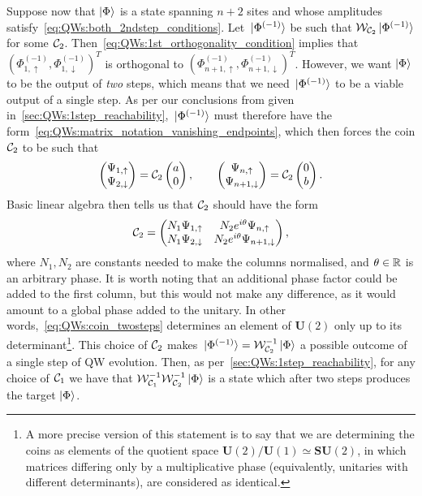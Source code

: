 Suppose now that $\ket\Phi$ is a state spanning $n+2$ sites and whose amplitudes satisfy~\cref{eq:QWs:both_2ndstep_conditions}.
Let $\ket*{\Phi^{(-1)}}$ be such that ${\mathcal{W}}_{{\mathcal{C}}_2}\ket*{\Phi^{(-1)}}$ for some ${\mathcal{C}}_2$.
Then~\cref{eq:QWs:1st_orthogonality_condition} implies that
$(\Phi^{(-1)}_{1,\uparrow},\Phi^{(-1)}_{1,\downarrow})^T$
is orthogonal to
$(\Phi^{(-1)}_{n+1,\uparrow},\Phi^{(-1)}_{n+1,\downarrow})^T$.
However, we want $\ket\Phi$ to be the output of \textit{two} steps, which means that we need $\ket*{\Phi^{(-1)}}$ to be a viable output of a single step. As per our conclusions from given in~\cref{sec:QWs:1step_reachability}, $\ket*{\Phi^{(-1)}}$ must therefore have the form~\cref{eq:QWs:matrix_notation_vanishing_endpoints}, which then forces the coin ${\mathcal{C}}_2$ to be such that
\begin{equation}
    \begin{pmatrix}
        \Psi_{1,\uparrow} \\ \Psi_{2,\downarrow}
    \end{pmatrix} =
    {\mathcal{C}}_2 \begin{pmatrix}
        a \\ 0
    \end{pmatrix},
    \qquad
    \begin{pmatrix}
        \Psi_{n,\uparrow} \\ \Psi_{n+1,\downarrow}
    \end{pmatrix} =
    {\mathcal{C}}_2 \begin{pmatrix}
        0 \\ b
    \end{pmatrix}.
\end{equation}
Basic linear algebra then tells us that ${\mathcal{C}}_2$ should have the form
\begin{equation}
    {\mathcal{C}}_2 = \begin{pmatrix}
        N_1 \Psi_{1,\uparrow} & N_2 e^{i\theta} \Psi_{n,\uparrow} \\
        N_1 \Psi_{2,\downarrow} & N_2 e^{i\theta} \Psi_{n+1,\downarrow}
    \end{pmatrix},
    \label{eq:QWs:coin_twosteps}
\end{equation}
where $N_1, N_2$ are constants needed to make the columns normalised, and $\theta\in{\mathbb{R}}$ is an arbitrary phase.
It is worth noting that an additional phase factor could be added to the first column, but this would not make any difference, as it would amount to a global phase added to the unitary. In other words,~\cref{eq:QWs:coin_twosteps} determines an element of $\mathbf{U}(2)$ only up to its determinant\footnote{A more precise version of this statement is to say that we are determining the coins as elements of the quotient space $\mathbf{U}(2)/\mathbf U(1)\simeq\mathbf{SU}(2)$, in which matrices differing only by a multiplicative phase (equivalently, unitaries with different determinants), are considered as identical.}.
This choice of ${\mathcal{C}}_2$ makes $\ket*{\Phi^{(-1)}}={\mathcal{W}}_{{\mathcal{C}}_2}^{-1}\ket\Phi$ a possible outcome of a single step of \ac{QW} evolution.
Then, as per~\cref{sec:QWs:1step_reachability}, for any choice of ${\mathcal{C}}_1$ we have that
${\mathcal{W}}_{{\mathcal{C}}_1}^{-1}{\mathcal{W}}_{{\mathcal{C}}_2}^{-1}\ket\Phi$
is a state which after two steps produces the target $\ket\Phi$.


